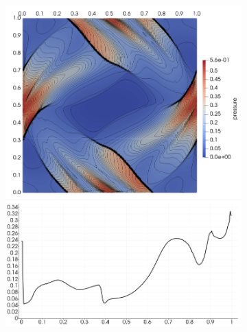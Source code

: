 \begin{figure}[H]
\centering
\begin{subfigure}[b]{0.425\textwidth}\includegraphics[width=\textwidth]{img/ot/my3.jpg}\end{subfigure}
\hspace{12mm}

\end{figure}

